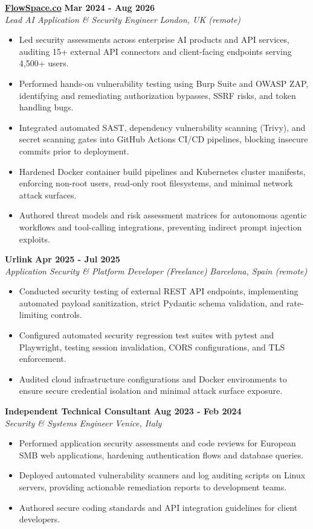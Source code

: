 \documentclass[10pt,a4paper]{article}
\newcommand{\role}[4]{%
  \textbf{#1} \hfill \textbf{#2}\\[1pt]%
  \textit{#3} \hfill \textit{#4}\\[2pt]%
}
\begin{document}
\role{\href{https://flowspace.co}{FlowSpace.co}}{Mar 2024 - Aug 2026}{Lead AI Application \& Security Engineer}{London, UK (remote)}
\begin{itemize}
  \item Led security assessments across enterprise AI products and API services, auditing 15+ external API connectors and client-facing endpoints serving 4,500+ users.
  \item Performed hands-on vulnerability testing using Burp Suite and OWASP ZAP, identifying and remediating authorization bypasses, SSRF risks, and token handling bugs.
  \item Integrated automated SAST, dependency vulnerability scanning (Trivy), and secret scanning gates into GitHub Actions CI/CD pipelines, blocking insecure commits prior to deployment.
  \item Hardened Docker container build pipelines and Kubernetes cluster manifests, enforcing non-root users, read-only root filesystems, and minimal network attack surfaces.
  \item Authored threat models and risk assessment matrices for autonomous agentic workflows and tool-calling integrations, preventing indirect prompt injection exploits.
\end{itemize}

\role{Urlink}{Apr 2025 - Jul 2025}{Application Security \& Platform Developer (Freelance)}{Barcelona, Spain (remote)}
\begin{itemize}
  \item Conducted security testing of external REST API endpoints, implementing automated payload sanitization, strict Pydantic schema validation, and rate-limiting controls.
  \item Configured automated security regression test suites with pytest and Playwright, testing session invalidation, CORS configurations, and TLS enforcement.
  \item Audited cloud infrastructure configurations and Docker environments to ensure secure credential isolation and minimal attack surface exposure.
\end{itemize}

\role{Independent Technical Consultant}{Aug 2023 - Feb 2024}{Security \& Systems Engineer}{Venice, Italy}
\begin{itemize}
  \item Performed application security assessments and code reviews for European SMB web applications, hardening authentication flows and database queries.
  \item Deployed automated vulnerability scanners and log auditing scripts on Linux servers, providing actionable remediation reports to development teams.
  \item Authored secure coding standards and API integration guidelines for client developers.
\end{itemize}
\end{document}
